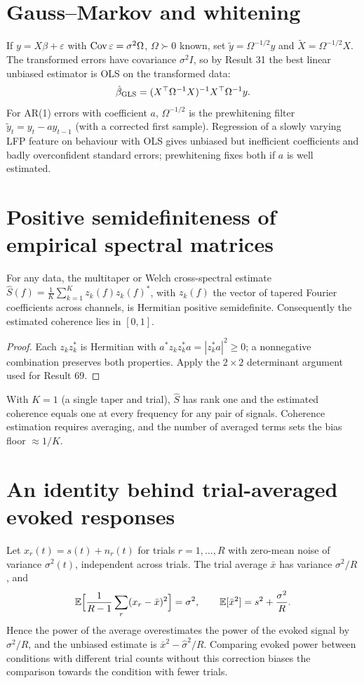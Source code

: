 \section{Gauss--Markov and whitening}
If $y=X\beta+\varepsilon$ with $\operatorname{Cov}\varepsilon=\sigma^2\Omega$, $\Omega\succ0$
known, set $\tilde y=\Omega^{-1/2}y$ and $\tilde X=\Omega^{-1/2}X$. The
transformed errors have covariance $\sigma^2I$, so by Result 31 the best
linear unbiased estimator is OLS on the transformed data:
\[
\hat\beta_{\rm GLS}=(X^\top\Omega^{-1}X)^{-1}X^\top\Omega^{-1}y.
\]
For AR(1) errors with coefficient $a$, $\Omega^{-1/2}$ is the
prewhitening filter $\tilde y_t=y_t-ay_{t-1}$ (with a corrected first
sample). Regression of a slowly varying LFP feature on behaviour with
OLS gives unbiased but inefficient coefficients and badly overconfident
standard errors; prewhitening fixes both if $a$ is well estimated.

\section{Positive semidefiniteness of empirical spectral matrices}
\begin{proposition}
For any data, the multitaper or Welch cross-spectral estimate
$\hat S(f)=\frac1K\sum_{k=1}^Kz_k(f)z_k(f)^\ast$, with $z_k(f)$ the vector
of tapered Fourier coefficients across channels, is Hermitian positive
semidefinite. Consequently the estimated coherence lies in $[0,1]$.
\end{proposition}
\begin{proof}
Each $z_kz_k^\ast$ is Hermitian with $a^\ast z_kz_k^\ast a=|z_k^\ast a|^2\ge0$; a
nonnegative combination preserves both properties. Apply the $2\times2$
determinant argument used for Result 69.
\end{proof}
With $K=1$ (a single taper and trial), $\hat S$ has rank one and the
estimated coherence equals one at every frequency for any pair of
signals. Coherence estimation requires averaging, and the number of
averaged terms sets the bias floor $\approx1/K$.

\section{An identity behind trial-averaged evoked responses}
Let $x_r(t)=s(t)+n_r(t)$ for trials $r=1,\ldots,R$ with zero-mean noise
of variance $\sigma^2(t)$, independent across trials. The trial average
$\bar x$ has variance $\sigma^2/R$, and
\[
\mathbb{E}\Bigl[\frac1{R-1}\sum_r(x_r-\bar x)^2\Bigr]=\sigma^2,\qquad
\mathbb{E}[\bar x^2]=s^2+\frac{\sigma^2}R.
\]
Hence the power of the average overestimates the power of the evoked
signal by $\sigma^2/R$, and the unbiased estimate is
$\bar x^2-\hat\sigma^2/R$. Comparing evoked power between conditions with
different trial counts without this correction biases the comparison
towards the condition with fewer trials.
